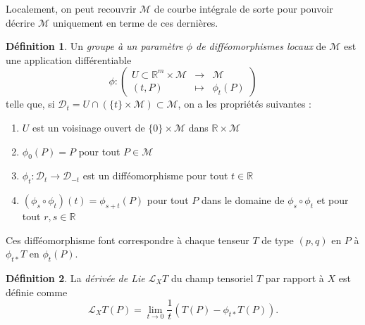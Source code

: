 \documentclass[a4paper,11pt]{report}
\theoremstyle{definition}
\theoremstyle{plain}
\theoremstyle{definition}
\newtheorem{defn}{Définition}[chapter]
\theoremstyle{remark}
\newcommand{\M}{\mathscr{M}}
\renewcommand{\L}{\mathscr{L}}
\begin{document}
            Localement, on peut recouvrir $\M$ de courbe intégrale de sorte pour pouvoir décrire $\M$ uniquement en terme de ces dernières.
            
            \begin{defn}
                Un \textit{groupe à un paramètre $\phi$ de difféomorphismes locaux} de $\M$ est une application différentiable
                \begin{equation}
                \phi:\left(
                \begin{array}{ccc}
                    U\subset\mathbb{R}^m\times\M & \longrightarrow & \M \\
                    (t,P) & \longmapsto & \phi_t(P)
                \end{array}
                \right)
                \end{equation}
                telle que, si $\mathcal{D}_t=U\cap(\{t\}\times\M)\subset\M$, on a les propriétés suivantes :
                \begin{enumerate}[label = \textit{\roman*)}]
                    \item $U$ est un voisinage ouvert de $\{0\}\times\M$ dans $\mathbb{R}\times\M$
                    \item $\phi_0(P)=P$ pour tout $P\in\M$
                    \item $\phi_t:\mathcal{D}_t\to\mathcal{D}_{-t}$ est un difféomorphisme pour tout $t\in\mathbb{R}$
                    \item $(\phi_s\circ\phi_t)(t) = \phi_{s+t}(P)$ pour tout $P$ dans le domaine de $\phi_s\circ\phi_t$ et pour tout $r,s\in\mathbb{R}$
                \end{enumerate}
            \end{defn}
            
            Ces difféomorphisme font correspondre à chaque tenseur $T$ de type $(p,q)$ en $P$ à $\phi_{t*}T$ en $\phi_t(P)$.
            
            \begin{defn}
                La \textit{dérivée de Lie} $\L_X T$ du champ tensoriel $T$ par rapport à $X$ est définie comme
                \begin{equation}
                    \L_X T (P) = \lim\limits_{t\to0} \frac{1}{t}\left(T(P)-\phi_{t*}T(P) \right).
                \end{equation}
            \end{defn}
            
\end{document}
